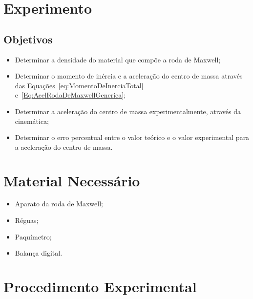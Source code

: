 \section{Experimento}

\subsection{Objetivos}

\begin{itemize}
	\item Determinar a densidade do material que compõe a roda de Maxwell;
	\item Determinar o momento de inércia e a aceleração do centro de massa através das Equações~\eqref{eq:MomentoDeInerciaTotal} e~\eqref{Eq:AcelRodaDeMaxwellGenerica};
	\item Determinar a aceleração do centro de massa experimentalmente, através da cinemática;
    \item Determinar o erro percentual entre o valor teórico e o valor experimental para a aceleração do centro de massa.
\end{itemize}

\section{Material Necessário}

\begin{itemize}
	\item Aparato da roda de Maxwell;
    \item Réguas;
    \item Paquímetro;
	\item Balança digital.
\end{itemize}

\section{Procedimento Experimental}

